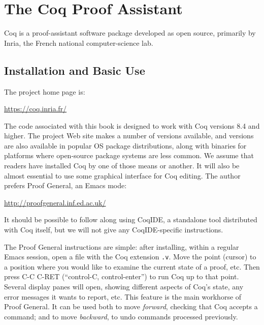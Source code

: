 \documentclass{amsbook}
\theoremstyle{definition}
\theoremstyle{remark}
\numberwithin{section}{chapter}
\numberwithin{equation}{chapter}
\begin{document}

\appendix


\chapter{The Coq Proof Assistant}

Coq is a proof-assistant software package developed as open source, primarily by Inria, the French national computer-science lab.

\section{Installation and Basic Use}

The project home page is:
\begin{center}
  \url{https://coq.inria.fr/}
\end{center}
The code associated with this book is designed to work with Coq versions 8.4 and higher.
The project Web site makes a number of versions available, and versions are also available in popular OS package distributions, along with binaries for platforms where open-source package systems are less common.
We assume that readers have installed Coq by one of those means or another.
It will also be almost essential to use some graphical interface for Coq editing.
The author prefers Proof General, an Emacs mode:
\begin{center}
  \url{http://proofgeneral.inf.ed.ac.uk/}
\end{center}
It should be possible to follow along using CoqIDE, a standalone tool distributed with Coq itself, but we will not give any CoqIDE-specific instructions.

The Proof General instructions are simple: after installing, within a regular Emacs session, open a file with the Coq extension \texttt{.v}.
Move the point (cursor) to a position where you would like to examine the current state of a proof, etc.
Then press C-C C-RET (``control-C, control-enter'') to run Coq up to that point.
Several display panes will open, showing different aspects of Coq's state, any error messages it wants to report, etc.
This feature is the main workhorse of Proof General.
It can be used both to move \emph{forward}, checking that Coq accepts a command; and to move \emph{backward}, to undo commands processed previously.
\end{document}
